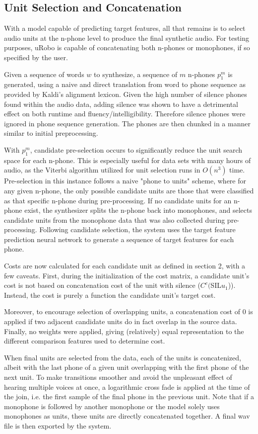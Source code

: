 \documentclass[10pt, journal, compsoc]{IEEEtran}
\begin{document}
\subsection{Unit Selection and Concatenation}
With a model capable of predicting target features, all that remains is to select audio units at the n-phone level to produce the final synthetic audio. For testing purposes, uRobo is capable of concatenating both n-phones or monophones, if so specified by the user.\par 
Given a sequence of words $w$ to synthesize, a sequence of $m$ n-phones $p_1^m$ is generated, using a naive and direct translation from word to phone sequence as provided by Kaldi's alignment lexicon. Given the high number of silence phones found within the audio data, adding silence was shown to have a detrimental effect on both runtime and fluency/intelligibility. Therefore silence phones were ignored in phone sequence generation. The phones are then chunked in a manner similar to initial preprocessing.\par 
With $p_1^m$, candidate pre-selection occurs to significantly reduce the unit search space for each n-phone. This is especially useful for data sets with many hours of audio, as the Viterbi algorithm utilized for unit selection runs in $O(n^3)$ time. Pre-selection in this instance follows a naive "phone to units" scheme, where for any given n-phone, the only possible candidate units are those that were classified as that specific n-phone during pre-processing. If no candidate units for an n-phone exist, the synthesizer splits the n-phone back into monophones, and selects candidate units from the monophone data that was also collected during pre-processing. Following candidate selection, the system uses the target feature prediction neural network to generate a sequence of target features for each phone.\par 
Costs are now calculated for each candidate unit as defined in section 2, with a few caveats. First, during the initialization of the cost matrix, a candidate unit's cost is not based on concatenation cost of the unit with silence ($C^c($SIL$u_1$)). Instead, the cost is purely a function the candidate unit's target cost.\par
Moreover, to encourage selection of overlapping units, a concatenation cost of 0 is applied if two adjacent candidate units do in fact overlap in the source data. Finally, no weights were applied, giving (relatively) equal representation to the different comparison features used to determine cost.\par
When final units are selected from the data, each of the units is concatenized, albeit with the last phone of a given unit overlapping with the first phone of the next unit. To make transitions smoother and avoid the unpleasant effect of hearing multiple voices at once, a logarithmic cross fade is applied at the time of the join, i.e. the first sample of the final phone in the previous unit. Note that if a monophone is followed by another monophone or the model solely uses monophones as units, these units are directly concatenated together. A final wav file is then exported by the system.
\end{document}
